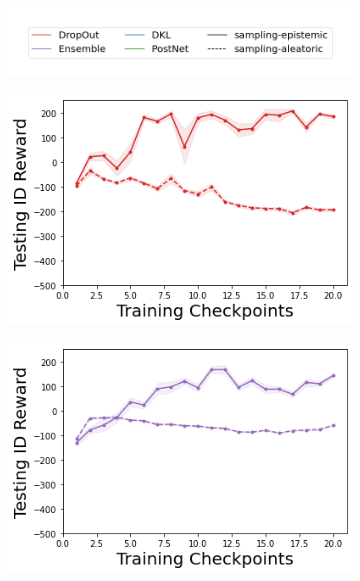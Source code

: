 \begin{figure}
    \centering
    \begin{subfigure}{.45\textwidth}
        \includegraphics[width=\textwidth]{sections/011_icml2022/resources/sampling-legend.png}
    \end{subfigure}
    \vspace{-5mm}
    
    \begin{subfigure}{.2\textwidth}
        \includegraphics[width=\textwidth]{sections/011_icml2022/resources/DropOut-LunarLander-v2-mean_reward_-testing-strategy.png}
    \end{subfigure}
    \begin{subfigure}{.2\textwidth}
        \includegraphics[width=\textwidth]{sections/011_icml2022/resources/Ensemble-LunarLander-v2-mean_reward_-testing-strategy.png}

\end{subfigure}
\end{figure}
